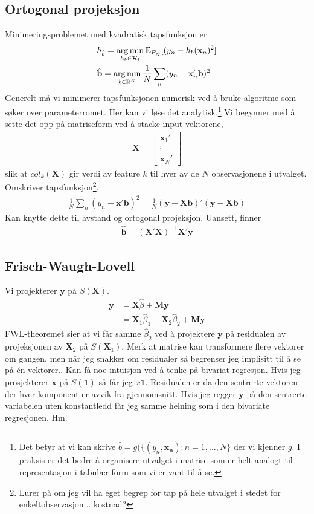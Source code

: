 \subsection{Ortogonal projeksjon}
Minimeringsproblemet med kvadratisk tapsfunksjon er
\begin{align}
&h_{\hat{b}} = \operatorname*{arg\,min}_{h_b \in \mathcal{H}_l} \mathbb{E}_{P_{\hat{N}}}[(y_n-h_b(\mathbf{x}_n)^2] \\
& \hat{\mathbf{b}} = \operatorname*{arg\,min}_{b \in \mathbb{R}^K} \frac{1}{N}\sum_n(y_n-\mathbf{x}_n'\mathbf{b})^2
\end{align}
Generelt må vi minimerer tapsfunksjonen numerisk ved å bruke algoritme som søker over parameterromet. Her kan vi løse det analytisk.\footnote{Det betyr at vi kan skrive $\hat{b} = g(\{(y_n,\mathbf{x_n}):n=1,...,N\}$ der vi kjenner $g$. I praksis er det bedre å organisere utvalget i matrise som er helt analogt til representasjon i tabulær form som vi er vant til å se.} Vi begynner med å sette det opp på matriseform ved å stacke input-vektorene,
\begin{align}
\mathbf{X}=
\begin{bmatrix}
\mathbf{x}_1' \\
\vdots \\
\mathbf{x}_N'
\end{bmatrix}
\end{align}
slik at $col_k(\mathbf{X})$ gir verdi av feature $k$ til hver av de $N$ observasjonene i utvalget. Omskriver tapsfunksjon\footnote{Lurer på om jeg vil ha eget begrep for tap på hele utvalget i stedet for enkeltobservasjon... kostnad?},
\begin{align}
\frac{1}{N}\sum_n(y_n-\mathbf{x}'\mathbf{b})^2 = \frac{1}{N}(\mathbf{y}-\mathbf{X}\mathbf{b})'(\mathbf{y}-\mathbf{X}\mathbf{b})
\end{align}
Kan knytte dette til avstand og ortogonal projeksjon. Uansett, finner
\begin{align}
\hat{\mathbf{b}} = (\mathbf{X}'\mathbf{X})^{-1}\mathbf{X}'\mathbf{y}
\end{align}
\subsection{Frisch-Waugh-Lovell}
Vi projekterer $\mathbf{y}$ på $S(\mathbf{X})$. 
\begin{align}
\mathbf{y} &= \mathbf{X} \hat{\beta} + \mathbf{M}\mathbf{y} \\
&= \mathbf{X}_1\hat{\beta}_1 + \mathbf{X}_2\hat{\beta}_2 + \mathbf{M}\mathbf{y}
\end{align}
FWL-theoremet sier at vi får samme $\hat{\beta}_2$ ved å projektere $\mathbf{y}$ på residualen av projeksjonen av $\mathbf{X}_2$ på $S(\mathbf{X}_1)$. Merk at matrise kan transformere flere vektorer om gangen, men når jeg snakker om residualer så begrenser jeg implisitt til å se på én vektorer.. Kan få noe intuisjon ved å tenke på bivariat regresjon. Hvis jeg prosjekterer $\mathbf{x}$ på $S(\mathbf{1})$ så får jeg $\bar{x}\mathbf{1}$. Residualen er da den sentrerte vektoren der hver komponent er avvik fra gjennomsnitt. Hvis jeg regger $\mathbf{y}$ på den sentrerte variabelen uten konstantledd får jeg samme helning som i den bivariate regresjonen. Hm.

